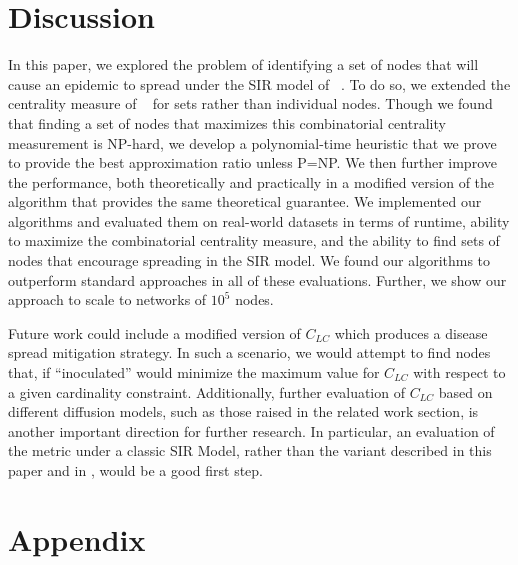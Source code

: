\section*{Discussion}
In this paper, we explored the problem of identifying a set of nodes that will cause an epidemic to spread under the SIR model of ~\cite{chen12}.  To do so, we extended the centrality measure of ~\cite{chen12} for sets rather than individual nodes.  Though we found that finding a set of nodes that maximizes this combinatorial centrality measurement is NP-hard, we develop a polynomial-time heuristic that we prove to provide the best approximation ratio unless P=NP.  We then further improve the performance, both theoretically and practically in a modified version of the algorithm that provides the same theoretical guarantee.  We implemented our algorithms and evaluated them on real-world datasets in terms of runtime, ability to maximize the combinatorial centrality measure, and the ability to find sets of nodes that encourage spreading in the SIR model.  We found our algorithms to outperform standard approaches in all of these evaluations.  Further, we show our approach to scale to networks of $10^5$ nodes.

Future work could include a modified version of $C_{LC}$ which produces a disease spread mitigation strategy.  In such a scenario, we would attempt to find nodes that, if ``inoculated'' would minimize the maximum value for $C_{LC}$ with respect to a given cardinality constraint.  Additionally, further evaluation of $C_{LC}$ based on different diffusion models, such as those raised in the related work section, is another important direction for further research.  In particular, an evaluation of the metric under a classic SIR Model, rather than the variant described in this paper and in \cite{chen12}, would be a good first step.

\section*{Appendix}

